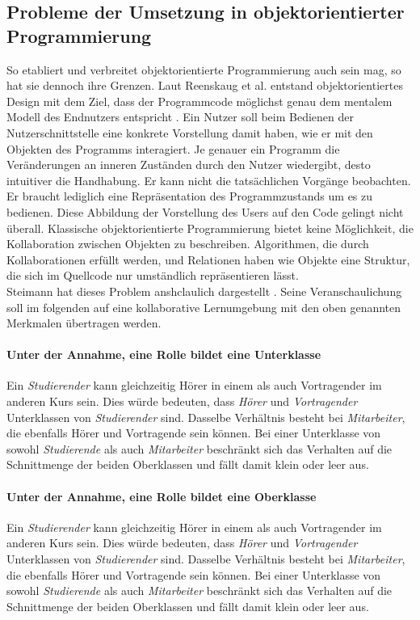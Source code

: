 \documentclass[conference]{IEEEtran}
\begin{document}
	
\subsection{Probleme der Umsetzung in objektorientierter Programmierung}  
So etabliert und verbreitet objektorientierte Programmierung auch sein mag, so hat sie dennoch ihre Grenzen. Laut Reenskaug et al. entstand objektorientiertes Design mit dem Ziel, dass der Programmcode möglichst genau dem mentalem Modell des Endnutzers entspricht \cite{reenskaug2009dci}. Ein Nutzer soll beim Bedienen der Nutzerschnittstelle eine konkrete Vorstellung damit haben, wie er mit den Objekten des Programms interagiert. Je genauer ein Programm die Veränderungen an inneren Zuständen durch den Nutzer wiedergibt, desto intuitiver die Handhabung. Er kann nicht die tatsächlichen Vorgänge beobachten. Er braucht lediglich eine Repräsentation des Programmzustands um es zu bedienen. Diese Abbildung der Vorstellung des Users auf den Code gelingt nicht überall. Klassische objektorientierte Programmierung bietet keine Möglichkeit, die Kollaboration zwischen Objekten zu beschreiben. Algorithmen, die durch Kollaborationen erfüllt werden, und Relationen haben wie Objekte eine Struktur, die sich im Quellcode nur umständlich repräsentieren lässt. \\ Steimann hat dieses Problem anshclaulich dargestellt \cite{steimann2000representation}. Seine Veranschaulichung soll im folgenden auf eine kollaborative Lernumgebung mit den oben genannten Merkmalen übertragen werden. \paragraph{Unter der Annahme, eine Rolle bildet eine Unterklasse} Ein \textit{Studierender} kann gleichzeitig Hörer in einem als auch Vortragender im anderen Kurs sein. Dies würde bedeuten, dass \textit{Hörer} und \textit{Vortragender} Unterklassen von \textit{Studierender} sind. Dasselbe Verhältnis besteht bei \textit{Mitarbeiter}, die ebenfalls Hörer und Vortragende sein können. Bei einer Unterklasse von sowohl \textit{Studierende} als auch \textit{Mitarbeiter} beschränkt sich das Verhalten auf die Schnittmenge der beiden Oberklassen und fällt damit klein oder leer aus.\paragraph{Unter der Annahme, eine Rolle bildet eine Oberklasse} Ein \textit{Studierender} kann gleichzeitig Hörer in einem als auch Vortragender im anderen Kurs sein. Dies würde bedeuten, dass \textit{Hörer} und \textit{Vortragender} Unterklassen von \textit{Studierender} sind. Dasselbe Verhältnis besteht bei \textit{Mitarbeiter}, die ebenfalls Hörer und Vortragende sein können. Bei einer Unterklasse von sowohl \textit{Studierende} als auch \textit{Mitarbeiter} beschränkt sich das Verhalten auf die Schnittmenge der beiden Oberklassen und fällt damit klein oder leer aus.
\end{document}
